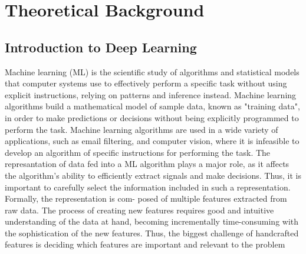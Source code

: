 \section{Theoretical Background}
\subsection{Introduction to Deep Learning}
\vspace{1em}
Machine learning (ML) is the scientific study of algorithms and statistical models that computer systems use to effectively perform a specific task without using explicit instructions, relying on patterns and inference instead. Machine learning algorithms build a mathematical model of sample data, known as "training data", in order to make predictions or decisions without being explicitly programmed to perform the task. Machine learning algorithms are used in a wide variety of applications, such as email filtering, and computer vision, where it is infeasible to develop an algorithm of specific instructions for performing the task. The represantation of data fed into a ML algorithm plays a major role, as it affects the algorithm’s ability to efficiently extract signals and make decisions. Thus, it is important to carefully select the information included in such a representation. Formally, the representation is com- posed of multiple features extracted from raw data. The process of creating new features requires good and intuitive understanding of the data at hand, becoming incrementally time-consuming with the sophistication of the new features. Thus, the biggest challenge of handcrafted features is deciding which features are important and relevant to the problem \cite{Goodfellow-et-al-2016}\par

